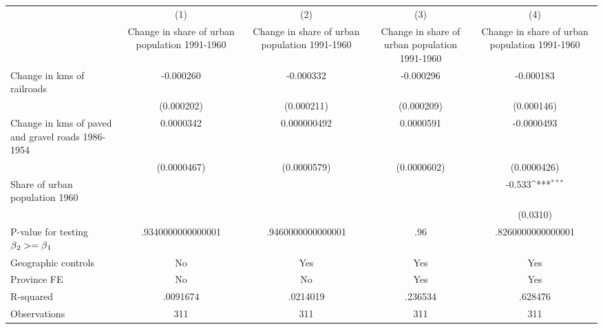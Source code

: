{
\def\sym#1{\ifmmode^{#1}\else\(^{#1}\)\fi}
\begin{tabular}{l*{4}{c}}
\hline\hline
                &\multicolumn{1}{c}{(1)}&\multicolumn{1}{c}{(2)}&\multicolumn{1}{c}{(3)}&\multicolumn{1}{c}{(4)}\\
                &\multicolumn{1}{c}{Change in share of urban population 1991-1960}&\multicolumn{1}{c}{Change in share of urban population 1991-1960}&\multicolumn{1}{c}{Change in share of urban population 1991-1960}&\multicolumn{1}{c}{Change in share of urban population 1991-1960}\\
\hline
Change in kms of railroads&-0.000260         &-0.000332         &-0.000296         &-0.000183         \\
                &(0.000202)         &(0.000211)         &(0.000209)         &(0.000146)         \\
[1em]
Change in kms of paved and gravel roads 1986-1954&0.0000342         &0.000000492         &0.0000591         &-0.0000493         \\
                &(0.0000467)         &(0.0000579)         &(0.0000602)         &(0.0000426)         \\
[1em]
Share of urban population 1960&                  &                  &                  &   -0.533\sym{***}\\
                &                  &                  &                  & (0.0310)         \\
\hline
P-value for testing $\beta\\_2 >= \beta\\_1$&.9340000000000001         &.9460000000000001         &      .96         &.8260000000000001         \\
Geographic controls&       No         &      Yes         &      Yes         &      Yes         \\
Province FE     &       No         &       No         &      Yes         &      Yes         \\
R-squared       & .0091674         & .0214019         &  .236534         &  .628476         \\
Observations    &      311         &      311         &      311         &      311         \\
\hline\hline
\end{tabular}
}
